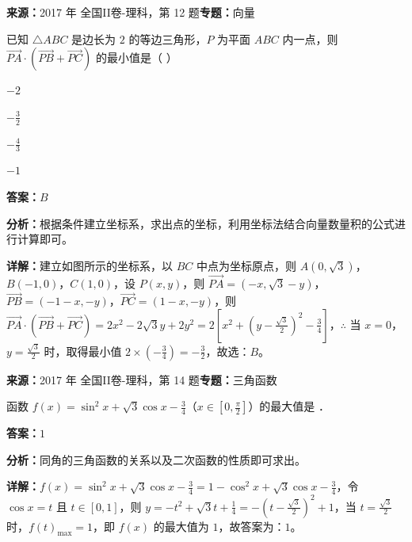 \begin{question}[points=5]
\textbf{来源：}2017 年 全国II卷-理科，第 12 题\quad \textbf{专题：}向量\par
已知 $\triangle ABC$ 是边长为 $2$ 的等边三角形，$P$ 为平面 $ABC$ 内一点，则 $\overrightarrow{PA}\cdot(\overrightarrow{PB}+\overrightarrow{PC})$ 的最小值是（   ）
\begin{choices}
  \item $-2$
  \item $-\frac{3}{2}$
  \item $-\frac{4}{3}$
  \item $-1$
\end{choices}
\begin{solution}
\textbf{答案：}$B$

\textbf{分析：}根据条件建立坐标系，求出点的坐标，利用坐标法结合向量数量积的公式进行计算即可。

\textbf{详解：}建立如图所示的坐标系，以 $BC$ 中点为坐标原点，则 $A(0,\sqrt{3})$，$B(-1,0)$，$C(1,0)$，设 $P(x,y)$，则 $\overrightarrow{PA}=(-x,\sqrt{3}-y)$，$\overrightarrow{PB}=(-1-x,-y)$，$\overrightarrow{PC}=(1-x,-y)$，则 $\overrightarrow{PA}\cdot(\overrightarrow{PB}+\overrightarrow{PC})=2x^2-2\sqrt{3}y+2y^2=2[x^2+(y-\frac{\sqrt{3}}{2})^2-\frac{3}{4}]$，$\therefore$ 当 $x=0$，$y=\frac{\sqrt{3}}{2}$ 时，取得最小值 $2\times(-\frac{3}{4})=-\frac{3}{2}$，故选：$B$。
\end{solution}
\end{question}

\begin{question}[points=5]
\textbf{来源：}2017 年 全国II卷-理科，第 14 题\quad \textbf{专题：}三角函数\par
函数 $f(x)=\sin^2x+\sqrt{3}\cos x-\frac{3}{4}$（$x\in[0,\frac{\pi}{2}]$）的最大值是 ．
\fillin[{$1$}]
\begin{solution}
\textbf{答案：}$1$

\textbf{分析：}同角的三角函数的关系以及二次函数的性质即可求出。

\textbf{详解：}$f(x)=\sin^2x+\sqrt{3}\cos x-\frac{3}{4}=1-\cos^2x+\sqrt{3}\cos x-\frac{3}{4}$，令 $\cos x=t$ 且 $t\in[0,1]$，则 $y=-t^2+\sqrt{3}t+\frac{1}{4}=-(t-\frac{\sqrt{3}}{2})^2+1$，当 $t=\frac{\sqrt{3}}{2}$ 时，$f(t)_{\max}=1$，即 $f(x)$ 的最大值为 $1$，故答案为：$1$。
\end{solution}
\end{question}

